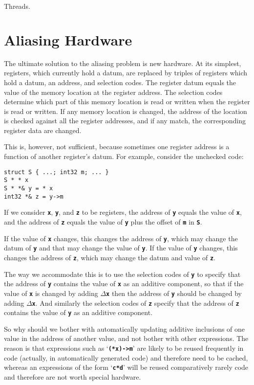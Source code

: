 \documentclass[12pt]{article}
\newcommand{\TT}[1]{{\tt \bfseries #1}}
\newenvironment{indpar}[1][0.3in]%
	{\begin{list}{}%
		     {\setlength{\itemsep}{0in}%
		      \setlength{\topsep}{0in}%
		      \setlength{\parsep}{1ex}%
		      \setlength{\labelwidth}{#1}%
		      \setlength{\leftmargin}{#1}%
		      \addtolength{\leftmargin}{\labelsep}}%
	 \item}%
	{\end{list}}
\begin{document}
\label{INDIRECT-ADDRESS-PROTOCOL}

Threads.
\label{THREADS}

\appendix

\section{Aliasing Hardware}
\label{ALIASING-HARDWARE}

The ultimate solution to the aliasing problem is new hardware.
At its simplest, registers, which currently hold a datum,
are replaced by triples of registers which hold a datum,
an address, and selection codes.  The register datum equals the value
of the memory location at the register address.  The selection
codes determine which part of this memory location is read or written
when the register is read or written.  If any memory location is
changed, the address of the location is checked against all the
register addresses, and if any match, the corresponding register
data are changed.

This is, however, not sufficient, because sometimes one register
address is a function of another register's datum.  For example,
consider the unchecked code:
\begin{indpar}[0.5em]\begin{verbatim}
struct S { ...; int32 m; ... }
S * * x
S * *& y = * x
int32 *& z = y->m
\end{verbatim}\end{indpar}
If we consider \TT{x}, \TT{y}, and \TT{z} to be registers,
the address of \TT{y} equals the value of \TT{x}, and the
address of \TT{z} equals the value of \TT{y} plus the offset of
\TT{m} in \TT{S}.

If the value of \TT{x} changes, this changes the address of \TT{y},
which may change the datum of \TT{y} and that may change the value
of \TT{y}.  If the value of \TT{y} changes, this changes the address
of \TT{z}, which may change the datum and value of \TT{z}.

The way we accommodate this is to use the selection codes of \TT{y}
to specify that the address of \TT{y} contains the value of \TT{x}
as an additive component, so
that if the value of \TT{x} is changed by adding $\Delta$\TT{x}
then the address of \TT{y} should be changed by adding $\Delta$\TT{x}.
And similarly the selection codes
of \TT{z} specify that the address of \TT{z}
contains the value of \TT{y} as an additive component.

So why should we bother with automatically updating
additive inclusions of one value in the
address of another value, and not bother with other expressions.
The reason is that expressions such as
`\TT{(*x)->m}' are likely to be reused frequently in code (actually,
in automatically generated code) and
therefore need to be cached, whereas an expressions of the form
`\TT{c*d}' will be reused comparatively rarely code
and therefore are not worth special hardware.





\printindex
\end{document}
